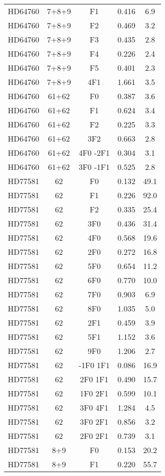 \begin{table*}
\begin{tabular}{l c c c c}
HD64760 & 7+8+9 & F1 & 0.416 & 6.9\\ 
HD64760 & 7+8+9 & F2 & 0.469 & 3.2\\ 
HD64760 & 7+8+9 & F3 & 0.435 & 2.8\\ 
HD64760 & 7+8+9 & F4 & 0.226 & 2.4\\ 
HD64760 & 7+8+9 & F5 & 0.401 & 2.3\\ 
HD64760 & 7+8+9 & 4F1 & 1.661 & 3.5\\ 
\hline
HD64760 & 61+62 & F0 & 0.387 & 3.6\\ 
HD64760 & 61+62 & F1 & 0.624 & 3.4\\ 
HD64760 & 61+62 & F2 & 0.225 & 3.3\\ 
HD64760 & 61+62 & 3F2 & 0.663 & 2.8\\ 
HD64760 & 61+62 & 4F0 -2F1 & 0.304 & 3.1\\ 
HD64760 & 61+62 & 3F0 -1F1 & 0.525 & 2.8\\ 
\hline
HD77581 & 62 & F0 & 0.132 & 49.1\\ 
HD77581 & 62 & F1 & 0.226 & 92.0\\ 
HD77581 & 62 & F2 & 0.335 & 25.4\\ 
HD77581 & 62 & 3F0 & 0.436 & 31.4\\ 
HD77581 & 62 & 4F0 & 0.568 & 19.6\\ 
HD77581 & 62 & 2F0 & 0.272 & 16.8\\ 
HD77581 & 62 & 5F0 & 0.654 & 11.2\\ 
HD77581 & 62 & 6F0 & 0.770 & 10.0\\ 
HD77581 & 62 & 7F0 & 0.903 & 6.9\\ 
HD77581 & 62 & 8F0 & 1.035 & 5.0\\ 
HD77581 & 62 & 2F1 & 0.459 & 3.9\\ 
HD77581 & 62 & 5F1 & 1.152 & 3.6\\ 
HD77581 & 62 & 9F0 & 1.206 & 2.7\\ 
HD77581 & 62 & -1F0 1F1 & 0.086 & 16.9\\ 
HD77581 & 62 & 2F0 1F1 & 0.490 & 15.7\\ 
HD77581 & 62 & 1F0 2F1 & 0.599 & 10.1\\ 
HD77581 & 62 & 3F0 4F1 & 1.284 & 4.5\\ 
HD77581 & 62 & 3F0 2F1 & 0.856 & 3.2\\ 
HD77581 & 62 & 2F0 2F1 & 0.739 & 3.1\\ 
\hline
HD77581 & 8+9 & F0 & 0.153 & 20.2\\ 
HD77581 & 8+9 & F1 & 0.220 & 55.7\\ 

\end{tabular}
\end{table*}
